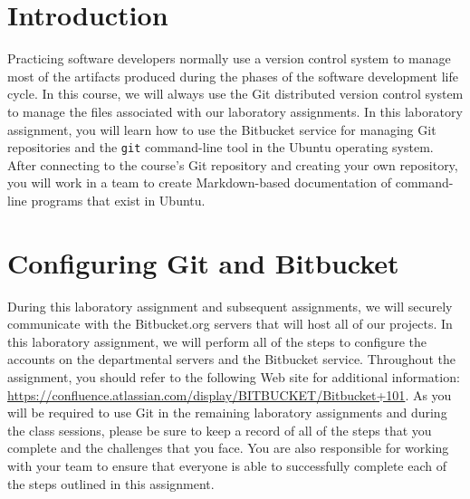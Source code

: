 

\usepackage[compact]{titlesec}



\section*{Introduction}

Practicing software developers normally use a version control system to manage most of the artifacts produced during the
phases of the software development life cycle.  In this course, we will always use the Git distributed version control
system to manage the files associated with our laboratory assignments.  In this laboratory assignment, you will learn
how to use the Bitbucket service for managing Git repositories and the {\tt git} command-line tool in the Ubuntu
operating system. After connecting to the course's Git repository and creating your own repository, you will work in a
team to create Markdown-based documentation of command-line programs that exist in Ubuntu.

\section*{Configuring Git and Bitbucket}

During this laboratory assignment and subsequent assignments, we will securely communicate with the Bitbucket.org
servers that will host all of our projects.  In this laboratory assignment, we will perform all of the steps to
configure the accounts on the departmental servers and the Bitbucket service.  Throughout the assignment, you should
refer to the following Web site for additional information:
\url{https://confluence.atlassian.com/display/BITBUCKET/Bitbucket+101}.  As you will be required to use Git in the
remaining laboratory assignments and during the class sessions, please be sure to keep a record of all of the steps that
you complete and the challenges that you face.  You are also responsible for working with your team to ensure that
everyone is able to successfully complete each of the steps outlined in this assignment.

